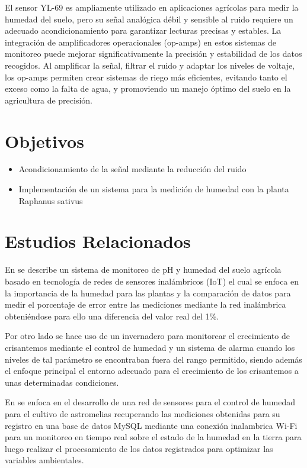 \documentclass[conference]{IEEEtran}
\begin{document}
	El sensor YL-69 es ampliamente utilizado en aplicaciones agrícolas para medir la humedad del suelo, pero su señal analógica débil y sensible al ruido requiere un adecuado acondicionamiento para garantizar lecturas precisas y estables. La integración de amplificadores operacionales (op-amps) en estos sistemas de monitoreo puede mejorar significativamente la precisión y estabilidad de los datos recogidos. Al amplificar la señal, filtrar el ruido y adaptar los niveles de voltaje, los op-amps permiten crear sistemas de riego más eficientes, evitando tanto el exceso como la falta de agua, y promoviendo un manejo óptimo del suelo en la agricultura de precisión.
	\section{Objetivos}
	
	\begin{itemize}
		\item Acondicionamiento de la señal mediante la reducción del ruido
		\item Implementación de un sistema para la medición de humedad con la planta Raphanus sativus
	\end{itemize}
	\section{Estudios Relacionados}
	
	En \cite{iotmonitoring} se describe un sistema de monitoreo de pH y humedad del suelo agrícola basado en tecnología de redes de sensores inalámbricos (IoT) el cual se enfoca en la importancia de la humedad para las plantas y la comparación de datos para medir el porcentaje de error entre las mediciones mediante la red inalámbrica obteniéndose para ello una diferencia del valor real del 1\%.
	
	Por otro lado \cite{chrysanthemum} se hace uso de un invernadero para monitorear el crecimiento de crisantemos mediante el control de humedad y un sistema de alarma cuando los niveles de tal parámetro se encontraban fuera del rango permitido, siendo además el enfoque principal el entorno adecuado para el crecimiento de los crisantemos a unas determinadas condiciones.
	
	En \cite{astromelia} se enfoca en el desarrollo de una red de sensores para el control de humedad para el cultivo de astromelias recuperando las mediciones obtenidas para su registro en una base de datos MySQL mediante una conexión inalambrica Wi-Fi para un monitoreo en tiempo real sobre el estado de la humedad en la tierra para luego realizar el procesamiento de los datos registrados para optimizar las variables ambientales.
	
\end{document}
